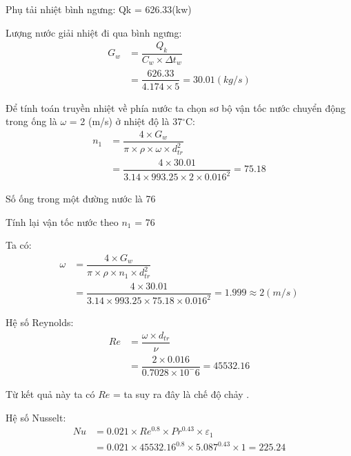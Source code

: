 Phụ tải nhiệt bình ngưng: Q{\scriptsize k} = 626.33(kw)

Lượng nước giải nhiệt đi qua bình ngưng:
\begin{equation*}
	\begin{split}
		G_{w} &= \dfrac{Q_{k}}{C_{w}\times \Delta t_{w}}\\
		&=\dfrac{626.33}{4.174 \times 5} = 30.01(kg/s)
	\end{split}
\end{equation*}

Để tính toán truyền nhiệt về phía nước ta chọn sơ bộ vận tốc nước chuyển động trong ống là $\omega$ = 2 (m/s) ở nhiệt độ là 37$^{\circ}$C:
\begin{equation*}
	\begin{split}
		n_{1} &= \dfrac{4\times G_{w}}{\pi\times\rho\times\omega\times d_{tr}^2}\\
		&= \dfrac{4 \times 30.01}{3.14 \times 993.25 \times 2 \times 0.016^2}= 75.18
	\end{split}
\end{equation*}

Số ống trong một đường nước là 76

Tính lại vận tốc nước theo $n_{1}$ = 76

Ta có:
\begin{equation*}
	\begin{split}
		\omega &= \dfrac{4\times G_{w}}{\pi\times\rho\times n_{1}\times d_{tr}^2}\\
		&= \dfrac{4 \times 30.01}{3.14 \times 993.25 \times 75.18 \times 0.016^2} = 1.999  \approx 2 (m/s)
	\end{split}
\end{equation*}

Hệ số Reynolds:
\begin{equation*}
	\begin{split}
		Re &= \dfrac{\omega\times d_{tr}}{\nu}\\
		&= \dfrac{2 \times 0.016}{0.7028 \times 10^-6} = 45532.16
	\end{split}
\end{equation*}

Từ kết quả này ta có $ Re $ =  ta suy ra đây là chế độ chảy .

Hệ số Nusselt:
\begin{equation*}
	\begin{split}
		Nu &= 0.021\times Re^{0.8} \times Pr^{0.43} \times\varepsilon_{1}\\
		&= 0.021 \times 45532.16^0.8 \times 5.087^0.43 \times 1 = 225.24
	\end{split}
\end{equation*}

